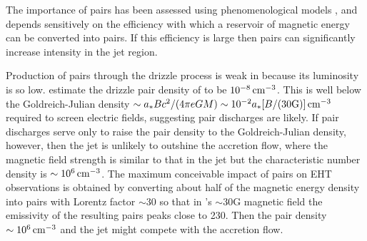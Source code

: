 The importance of pairs has been assessed using phenomenological models \citep{2020ApJ...896...30A, 2021arXiv210105327E}, and depends sensitively on the efficiency with which a reservoir of magnetic energy can be converted into pairs.  If this efficiency is large then pairs can significantly increase intensity in the jet region.

Production of pairs through the drizzle process is weak in \sgra because its luminosity is so low.  \cite{2011ApJ...735....9M} \citep[see also][]{2021ApJ...907...73W} estimate the drizzle pair density of \sgra to be $10^{-8}\,\mathrm{cm}^{-3}$.  This is well below the Goldreich-Julian density $\sim a_* B c^2/(4 \pi e G M) \sim 10^{-2} a_* [B/(30 {\rm G})] \,\mathrm{cm}^{-3}$ required to screen electric fields, suggesting pair discharges are likely.  If pair discharges serve only to raise the pair density to the Goldreich-Julian density, however, then the jet is unlikely to outshine the accretion flow, where the magnetic field strength is similar to that in the jet but the characteristic number density is $\sim 10^6 \,\mathrm{cm}^{-3}$.  The maximum conceivable impact of pairs on EHT observations is obtained by converting about half of the magnetic energy density into pairs with Lorentz factor $\sim 30$ so that in \sgra's $\sim 30$G magnetic field the emissivity of the resulting pairs peaks close to 230\GHz.  Then the pair density $\sim 10^{6} \,\mathrm{cm}^{-3}$ and the jet might compete with the accretion flow.





